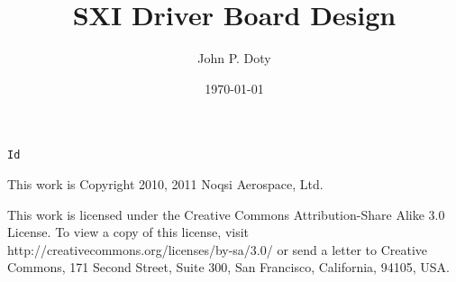 \usepackage{ucs}
\usepackage[utf8x]{inputenc}
\usepackage[english]{babel}
\usepackage{fontenc}
\usepackage{graphicx}
\usepackage{grffile}
\usepackage[hmargin=2cm,vmargin=2.5cm]{geometry}
\usepackage{tikz-timing}

\setlength{\parindent}{0.0in}
\setlength{\parskip}{0.1in}

\newcommand{\tsvtable}[1]{
\begin{table}[h]
\centering
\texttt{[image: \#1.tsv.pdf]}
\caption{#1}
\label{#1}
\end{table}
}

\usepackage{placeins}
\let\oldsection\section
\renewcommand{\section}{\FloatBarrier\oldsection} 

\pagestyle{headings}

\usepackage[pdftex]{hyperref}

\author{John P. Doty}
\date{\today}
\title{SXI Driver Board Design}


\begin{titlepage}
\maketitle
\begin{center}
\verb$Id$
\end{center}
\vspace{5cm}

This work is Copyright 2010, 2011 Noqsi Aerospace, Ltd.

This work is licensed under the Creative Commons Attribution-Share Alike 3.0 License. To view a copy of this license, visit http://creativecommons.org/licenses/by-sa/3.0/ or send a letter to Creative Commons, 171 Second Street, Suite 300, San Francisco, California, 94105, USA.

\end{titlepage} 

